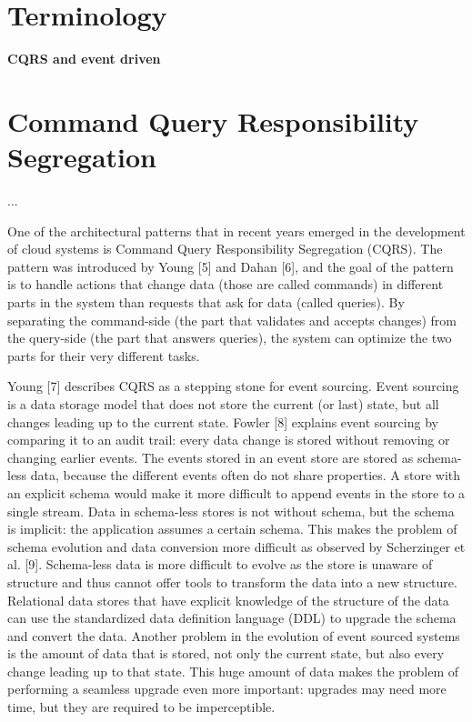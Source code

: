 \section{Terminology}

\textbf{CQRS and event driven}

\section{Command Query Responsibility Segregation}



...\citep{young2010cqrs}

One of the architectural patterns that in recent years emerged in the development of cloud systems is Command Query Responsibility Segregation (CQRS). The pattern was introduced by Young [5] and Dahan [6], and the goal of the pattern is to handle actions that change data (those are called commands) in different parts in the system than requests that ask for data (called queries). By separating the command-side (the part that validates and accepts changes) from the query-side (the part that answers queries), the system can optimize the two parts for their very different tasks.

Young [7] describes CQRS as a stepping stone for event sourcing. Event sourcing is a data storage model that does not store the current (or last) state, but all changes leading up to the current state. Fowler [8] explains event sourcing by comparing it to an audit trail: every data change is stored without removing or changing earlier events. The events stored in an event store are stored as schema-less data, because the different events often do not share properties. A store with an explicit schema would make it more difficult to append events in the store to a single stream. Data in schema-less stores is not without schema, but the schema is implicit: the application assumes a certain schema. This makes the problem of schema evolution and data conversion more difficult as observed by Scherzinger et al. [9]. Schema-less data is more difficult to evolve as the store is unaware of structure and thus cannot offer tools to transform the data into a new structure. Relational data stores that have explicit knowledge of the structure of the data can use the standardized data definition language (DDL) to upgrade the schema and convert the data. Another problem in the evolution of event sourced systems is the amount of data that is stored, not only the current state, but also every change leading up to that state. This huge amount of data makes the problem of performing a seamless upgrade even more important: upgrades may need more time, but they are required to be imperceptible.

